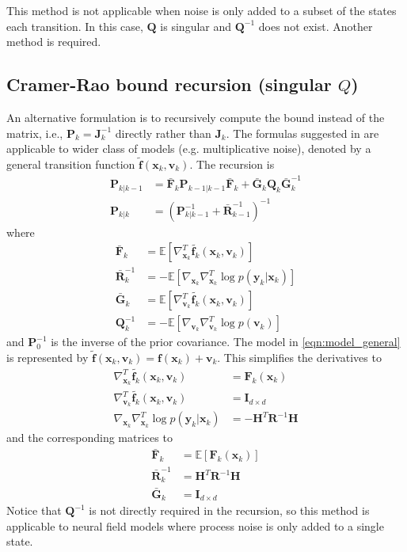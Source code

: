 \documentclass{article}
\renewcommand{\vec}[1]{\ensuremath{{\boldsymbol #1}}}
\newcommand{\mat}[1]{\ensuremath{\boldsymbol{#1}}}
\begin{document}
This method is not applicable when noise is only added to a subset of the states each transition. In this case, $\mat Q$ is singular and $\mat Q^{-1}$ does not exist. Another method is required.

\subsection{Cramer-Rao bound recursion (singular $Q$)} 

An alternative formulation is to recursively compute the bound instead of the matrix, i.e., $\mat P_k = \mat J_k^{-1}$ directly rather than $\mat J_k$. The formulas suggested in \cite{Bergman2001} are applicable to wider class of models (e.g. multiplicative noise), denoted by a general transition function $\tilde{\vec f}(\vec x_k,\vec v_k)$. The recursion is
\begin{subequations}
\begin{align}
	\mat P_{k|k-1} &= \bar{\mat F}_k\mat P_{k-1|k-1}\bar{\mat F}_k + \bar{\mat G}_k\mat Q_k \bar{\mat G}_k^{-1} \\
		\mat P_{k|k} &= \left(\mat P_{k|k-1}^{-1} + \bar{\mat R}_{k-1}^{-1}\right)^{-1}
\end{align}
\end{subequations}
where
\begin{align}
	\bar{\mat F}_k &= \mathbb E \left[ \nabla_{\vec x_k}^T \tilde{\vec f_k}(\vec x_k,\vec v_k)\right] \\
	\bar{\mat R}_k^{-1} &= -\mathbb E\left[ \nabla_{\vec x_k}\nabla_{\vec x_k}^T \log p(\vec y_k|\vec x_k) \right] \\
	\bar{\mat G}_k &= \mathbb E \left[ \nabla_{\vec v_k}^T \tilde{\vec f_k}(\vec x_k,\vec v_k)\right] \\
	\mat Q_k^{-1} &= -\mathbb E \left[ \nabla_{\vec v_k}\nabla_{\vec v_k}^T \log p(\vec v_k) \right]
\end{align}
and $\mat P_0^{-1}$ is the inverse of the prior covariance. The model in \eqref{eqn:model_general} is represented by $\tilde{\vec f}(\vec x_k,\vec v_k) = \vec f(\vec x_k) + \vec v_k$. This simplifies the derivatives to
\begin{align}
	\nabla_{\vec x_k}^T \tilde{\vec f_k}(\vec x_k,\vec v_k) &= \mat F_k(\vec x_k) \\
	\nabla_{\vec v_k}^T \tilde{\vec f_k}(\vec x_k,\vec v_k) &= \mat I_{d\times d} \\
	\nabla_{\vec x_k}\nabla_{\vec x_k}^T \log p(\vec y_k|\vec x_k) &= -\mat H^T\mat R^{-1} \mat H 
\end{align}
and the corresponding matrices to	
\begin{align}
	\bar{\mat F}_k &= \mathbb E\left[ \mat F_k(\vec x_k)\right] \label{eqn:pcrb_term_F}\\
	\bar{\mat R}_k^{-1} &= \mat H^T\mat R^{-1} \mat H \\
	\bar{\mat G}_k &= \mat I_{d\times d} 
\end{align}
Notice that $\mat Q^{-1}$ is not directly required in the recursion, so this method is applicable to neural field models where process noise is only added to a single state.
\end{document}
